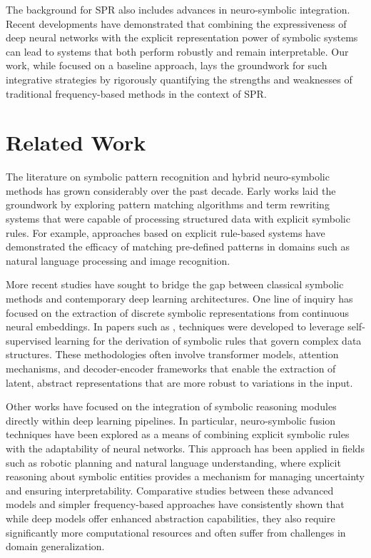 \documentclass{article}
\begin{document}
The background for SPR also includes advances in neuro-symbolic integration. Recent developments have demonstrated that combining the expressiveness of deep neural networks with the explicit representation power of symbolic systems can lead to systems that both perform robustly and remain interpretable. Our work, while focused on a baseline approach, lays the groundwork for such integrative strategies by rigorously quantifying the strengths and weaknesses of traditional frequency-based methods in the context of SPR.

\section{Related Work}
The literature on symbolic pattern recognition and hybrid neuro-symbolic methods has grown considerably over the past decade. Early works laid the groundwork by exploring pattern matching algorithms and term rewriting systems that were capable of processing structured data with explicit symbolic rules. For example, approaches based on explicit rule-based systems have demonstrated the efficacy of matching pre-defined patterns in domains such as natural language processing and image recognition.

More recent studies have sought to bridge the gap between classical symbolic methods and contemporary deep learning architectures. One line of inquiry has focused on the extraction of discrete symbolic representations from continuous neural embeddings. In papers such as \cite{arxiv2503, arxiv2410}, techniques were developed to leverage self-supervised learning for the derivation of symbolic rules that govern complex data structures. These methodologies often involve transformer models, attention mechanisms, and decoder-encoder frameworks that enable the extraction of latent, abstract representations that are more robust to variations in the input.

Other works have focused on the integration of symbolic reasoning modules directly within deep learning pipelines. In particular, neuro-symbolic fusion techniques have been explored as a means of combining explicit symbolic rules with the adaptability of neural networks. This approach has been applied in fields such as robotic planning and natural language understanding, where explicit reasoning about symbolic entities provides a mechanism for managing uncertainty and ensuring interpretability. Comparative studies between these advanced models and simpler frequency-based approaches have consistently shown that while deep models offer enhanced abstraction capabilities, they also require significantly more computational resources and often suffer from challenges in domain generalization.
\end{document}
